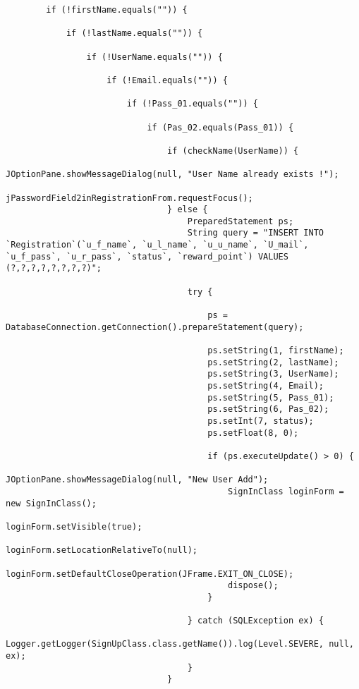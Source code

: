 \documentclass[12pt,a4paper]{article}
\begin{document}
\begin{lstlisting}
        if (!firstName.equals("")) {

            if (!lastName.equals("")) {

                if (!UserName.equals("")) {

                    if (!Email.equals("")) {

                        if (!Pass_01.equals("")) {

                            if (Pas_02.equals(Pass_01)) {

                                if (checkName(UserName)) {
                                    JOptionPane.showMessageDialog(null, "User Name already exists !");
                                    jPasswordField2inRegistrationFrom.requestFocus();
                                } else {
                                    PreparedStatement ps;
                                    String query = "INSERT INTO `Registration`(`u_f_name`, `u_l_name`, `u_u_name`, `U_mail`, `u_f_pass`, `u_r_pass`, `status`, `reward_point`) VALUES (?,?,?,?,?,?,?,?)";

                                    try {

                                        ps = DatabaseConnection.getConnection().prepareStatement(query);

                                        ps.setString(1, firstName);
                                        ps.setString(2, lastName);
                                        ps.setString(3, UserName);
                                        ps.setString(4, Email);
                                        ps.setString(5, Pass_01);
                                        ps.setString(6, Pas_02);
                                        ps.setInt(7, status);
                                        ps.setFloat(8, 0);

                                        if (ps.executeUpdate() > 0) {
                                            JOptionPane.showMessageDialog(null, "New User Add");
                                            SignInClass loginForm = new SignInClass();
                                            loginForm.setVisible(true);
                                            loginForm.setLocationRelativeTo(null);
                                            loginForm.setDefaultCloseOperation(JFrame.EXIT_ON_CLOSE);
                                            dispose();
                                        }

                                    } catch (SQLException ex) {
                                        Logger.getLogger(SignUpClass.class.getName()).log(Level.SEVERE, null, ex);
                                    }
                                }


\end{lstlisting}
\end{document}
